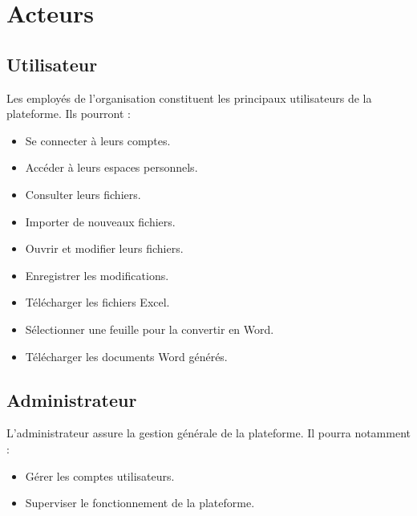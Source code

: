 \chapter{Acteurs}

\section{Utilisateur}

Les employés de l'organisation constituent les principaux utilisateurs de la plateforme. Ils pourront :

\begin{itemize}
    \item Se connecter à leurs comptes.
    \item Accéder à leurs espaces personnels.
    \item Consulter leurs fichiers.
    \item Importer de nouveaux fichiers.
    \item Ouvrir et modifier leurs fichiers.
    \item Enregistrer les modifications.
    \item Télécharger les fichiers Excel.
    \item Sélectionner une feuille pour la convertir en Word.
    \item Télécharger les documents Word générés.
\end{itemize}

\section{Administrateur}

L'administrateur assure la gestion générale de la plateforme. Il pourra notamment :

\begin{itemize}
    \item Gérer les comptes utilisateurs.
    \item Superviser le fonctionnement de la plateforme.
\end{itemize}
